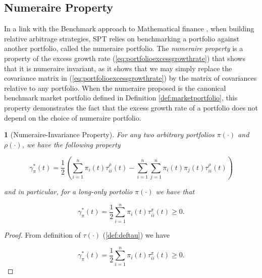 \documentclass[british]{amsart} \usepackage{lmodern}
\numberwithin{equation}{section} \numberwithin{figure}{section}
\theoremstyle{plain} \newtheorem{thm}{\protect\theoremname}[section]
\theoremstyle{definition} \newtheorem{defn}[thm]{\protect\definitionname}
\theoremstyle{plain} \newtheorem{assumption}[thm]{\protect\assumptionname}
\theoremstyle{plain} \newtheorem{lem}[thm]{\protect\lemmaname}
\theoremstyle{plain} \newtheorem{prop}[thm]{\protect\propositionname}
\theoremstyle{remark} \newtheorem{rem}[thm]{\protect\remarkname}
\theoremstyle{plain} \newtheorem{cor}[thm]{\protect\corollaryname}
\begin{document}
\subsection{Numeraire Property}

In a link with the Benchmark approach to Mathematical finance \cite{platen2006},
when building relative arbitrage strategies, SPT relies on benchmarking a
portfolio against another portfolio, called the numeraire portfolio. The
\textit{numeraire property} is a property of the excess growth rate
(\ref{eq:portfolioexcessgrowthrate}) that shows that it is numeraire invariant,
as it shows that we may simply replace the covariance matrix in
(\ref{eq:portfolioexcessgrowthrate}) by the matrix of covariances relative to
any portfolio. When the numeraire proposed is the canonical benchmark market
portfolio defined in Definition \ref{def:marketportfolio}, this property
demonstrates the fact that the excess growth rate of a portfolio does not depend
on the choice of numeraire portfolio.

\begin{lem} [Numeraire-Invariance Property]
 For any two arbitrary portfolios $\pi(\cdot)$ and $\rho(\cdot)$, we have the
following property 

  \begin{equation} 
    \label{eq:numeraireinvarianceproperty}
    \gamma_{\pi}^{*}(t) = \frac{1}{2} 
        \left(
          \sum_{i=1}^{n} \pi_{i}(t)\tau_{ii}^{\rho}(t) - 
          \sum_{i=1}^{n} \sum_{j=1}^{n} \pi_{i}(t)\pi_{j}(t)\tau_{ii}^{\rho}(t) 
        \right)
  \end{equation}

  and in particular, for a long-only portolio $\pi(\cdot)$ we have that

  \begin{equation} 
    \label{eq:numeraireinvarianceproperty}
    \gamma_{\pi}^{*}(t) = \frac{1}{2} 
          \sum_{i=1}^{n} \pi_{i}(t)\tau_{ii}^{\pi}(t) 
     \ge 0. 
  \end{equation}
 
\end{lem}

\begin{proof}

  From definition of $\tau(\cdot)$ (\ref{def:deftau}) we have

  \begin{equation} 
    \gamma_{\pi}^{*}(t) = \frac{1}{2} 
          \sum_{i=1}^{n} \pi_{i}(t)\tau_{ii}^{\pi}(t) 
     \ge 0. 
  \end{equation}

\end{proof}
\end{document}
